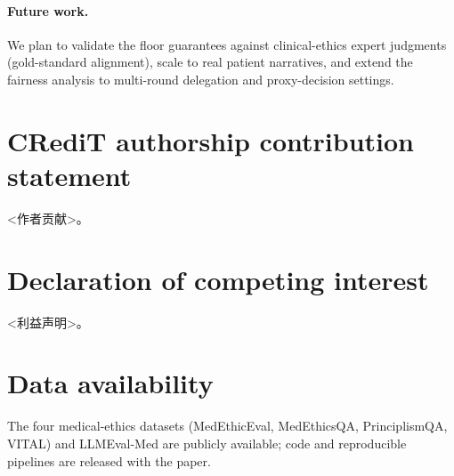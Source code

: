 \documentclass[11pt]{article}
\begin{document}
\paragraph{Future work.}
We plan to validate the floor guarantees against clinical-ethics expert
judgments (gold-standard alignment), scale to real patient narratives, and
extend the fairness analysis to multi-round delegation and proxy-decision
settings.

\section*{CRediT authorship contribution statement}
<作者贡献>。
\section*{Declaration of competing interest}
<利益声明>。
\section*{Data availability}
The four medical-ethics datasets (MedEthicEval, MedEthicsQA, PrinciplismQA,
VITAL) and LLMEval-Med are publicly available; code and reproducible
pipelines are released with the paper.



\end{document}
